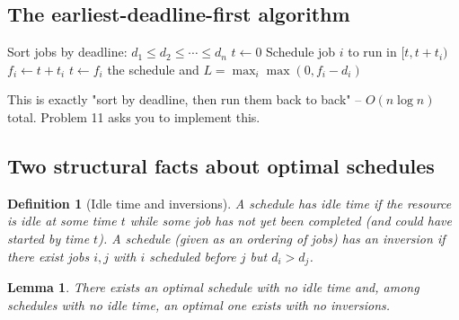\documentclass[11pt]{article}
\newtheorem{lemma}[theorem]{Lemma}
\newtheorem{definition}[theorem]{Definition}
\begin{document}
\subsection{The earliest-deadline-first algorithm}

\begin{algorithm}[h]
\caption{Earliest-Deadline-First (Minimizing Lateness)}
\begin{algorithmic}[1]
\State Sort jobs by deadline: $d_1 \le d_2 \le \cdots \le d_n$
\State $t \gets 0$
    \State Schedule job $i$ to run in $[t, t + t_i)$
    \State $f_i \gets t + t_i$
    \State $t \gets f_i$
\EndFor
\State \Return the schedule and $L = \max_i \max(0, f_i - d_i)$
\end{algorithmic}
\end{algorithm}

This is exactly "sort by deadline, then run them back to back" -- $O(n \log n)$ total.
Problem 11 asks you to implement this.

\subsection{Two structural facts about optimal schedules}

\begin{definition}[Idle time and inversions]
A schedule has \emph{idle time} if the resource is idle at some time $t$ while some job
has not yet been completed (and could have started by time $t$). A schedule (given as an
ordering of jobs) has an \emph{inversion} if there exist jobs $i, j$ with $i$ scheduled
before $j$ but $d_i > d_j$.
\end{definition}

\begin{lemma}
\label{lem:no-idle}
There exists an optimal schedule with no idle time and, among schedules with no idle
time, an optimal one exists with no inversions.
\end{lemma}
\end{document}
